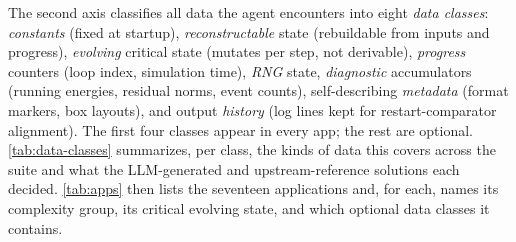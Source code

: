 \documentclass[conference]{IEEEtran}
\begin{document}
The second axis classifies all data the agent encounters into eight \emph{data classes}: \emph{constants} (fixed at startup), \emph{reconstructable} state (rebuildable from inputs and progress), \emph{evolving} critical state (mutates per step, not derivable), \emph{progress} counters (loop index, simulation time), \emph{RNG} state, \emph{diagnostic} accumulators (running energies, residual norms, event counts), self-describing \emph{metadata} (format markers, box layouts), and output \emph{history} (log lines kept for restart-comparator alignment). The first four classes appear in every app; the rest are optional. \autoref{tab:data-classes} summarizes, per class, the kinds of data this covers across the suite and what the LLM-generated and upstream-reference solutions each decided. \autoref{tab:apps} then lists the seventeen applications and, for each, names its complexity group, its critical evolving state, and which optional data classes it contains.
\end{document}
